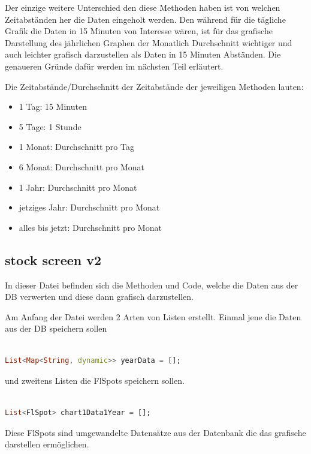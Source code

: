 \documentclass[11pt]{scrartcl}
\begin{document}
Der einzige weitere Unterschied den diese Methoden haben ist von welchen Zeitabständen her die Daten eingeholt werden. Den während für die tägliche Grafik die Daten in 15 Minuten von Interesse wären, ist für das grafische Darstellung des jährlichen Graphen der Monatlich Durchschnitt wichtiger und auch leichter grafisch darzustellen als Daten in 15 Minuten Abständen. Die genaueren Gründe dafür werden im nächsten Teil erläutert.

Die Zeitabstände/Durchschnitt der Zeitabstände der jeweiligen Methoden lauten:
\begin{itemize}[noitemsep, topsep=0pt]
    \item 1 Tag: 15 Minuten
    \item 5 Tage: 1 Stunde
    \item 1 Monat: Durchschnitt pro Tag
    \item 6 Monat: Durchschnitt pro Monat
    \item 1 Jahr: Durchschnitt pro Monat
    \item jetziges Jahr: Durchschnitt pro Monat
    \item alles bis jetzt: Durchschnitt pro Monat
\end{itemize}

\subsection*{stock screen v2}

In dieser Datei befinden sich die Methoden und Code, welche die Daten aus der DB verwerten und diese dann grafisch darzustellen.

Am Anfang der Datei werden 2 Arten von Listen erstellt. Einmal jene die Daten aus der DB speichern sollen

\begin{lstlisting}[language=Dart]

List<Map<String, dynamic>> yearData = [];

\end{lstlisting}

und zweitens Listen die FlSpots speichern sollen.

\begin{lstlisting}[language=Dart]

List<FlSpot> chart1Data1Year = [];

\end{lstlisting}

Diese FlSpots sind umgewandelte Datensätze aus der Datenbank die das grafische darstellen ermöglichen.
\end{document}
